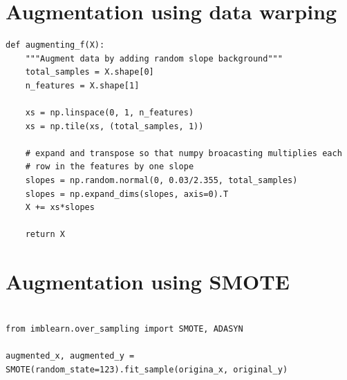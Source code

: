 












\chapter{Augmentation using data warping}
\label{chapter:first-appendix}
\lstset{language=Python, caption=Function to create data warping, label=Simple data warping}
\begin{lstlisting}
def augmenting_f(X):
	"""Augment data by adding random slope background"""
	total_samples = X.shape[0]
	n_features = X.shape[1]
	
	xs = np.linspace(0, 1, n_features)
	xs = np.tile(xs, (total_samples, 1))
	
	# expand and transpose so that numpy broacasting multiplies each
	# row in the features by one slope
	slopes = np.random.normal(0, 0.03/2.355, total_samples)
	slopes = np.expand_dims(slopes, axis=0).T
	X += xs*slopes
	
	return X
\end{lstlisting}

\chapter{Augmentation using SMOTE}
\label{chapter:second-appendix}
\lstset{language=Python, caption=Implimentation of SMOTE, label=Simple data augmentation}
\begin{lstlisting}

from imblearn.over_sampling import SMOTE, ADASYN

augmented_x, augmented_y = SMOTE(random_state=123).fit_sample(origina_x, original_y)

\end{lstlisting}

